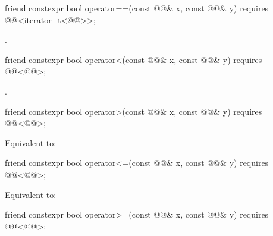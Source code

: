 %
\begin{itemdecl}
friend constexpr bool operator==(const @@& x, const @@& y)
  requires @@<iterator_t<@@>>;
\end{itemdecl}

\begin{itemdescr}
\pnum
\returns
{}.
\end{itemdescr}

%
\begin{itemdecl}
friend constexpr bool operator<(const @@& x, const @@& y)
  requires @@<@@>;
\end{itemdecl}

\begin{itemdescr}
\pnum
\returns
{}.
\end{itemdescr}

%
\begin{itemdecl}
friend constexpr bool operator>(const @@& x, const @@& y)
  requires @@<@@>;
\end{itemdecl}

\begin{itemdescr}
\pnum
\effects
Equivalent to: 
\end{itemdescr}

%
\begin{itemdecl}
friend constexpr bool operator<=(const @@& x, const @@& y)
  requires @@<@@>;
\end{itemdecl}

\begin{itemdescr}
\pnum
\effects
Equivalent to: 
\end{itemdescr}

%
\begin{itemdecl}
friend constexpr bool operator>=(const @@& x, const @@& y)
  requires @@<@@>;
\end{itemdecl}

